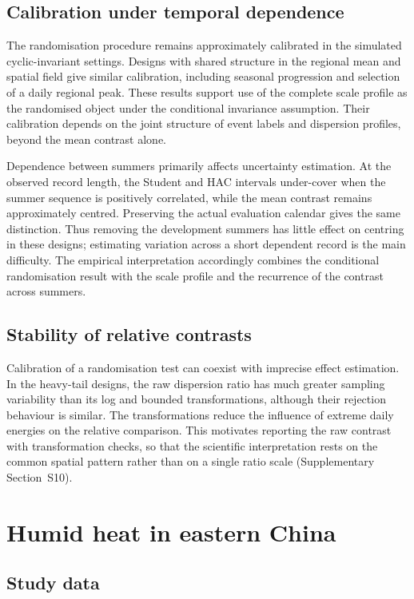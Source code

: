 \documentclass[namedate,webpdf,modern,mediumone]{oup-authoring-template}
\begin{document}
\subsection{Calibration under temporal dependence}

The randomisation procedure remains approximately calibrated in the
simulated cyclic-invariant settings. Designs with shared structure in the
regional mean and spatial field give similar calibration, including seasonal
progression and selection of a daily regional peak. These results support
use of the complete scale profile as the randomised object under the
conditional invariance assumption. Their calibration depends on the joint structure of event labels and
dispersion profiles, beyond the mean contrast alone.

Dependence between summers primarily affects uncertainty estimation. At the
observed record length, the Student and HAC intervals under-cover when the
summer sequence is positively correlated, while the mean contrast remains
approximately centred. Preserving the actual evaluation calendar gives the
same distinction. Thus removing the development summers has little effect on
centring in these designs; estimating variation across a short dependent
record is the main difficulty. The empirical interpretation accordingly
combines the conditional randomisation result with the scale profile and the
recurrence of the contrast across summers.

\subsection{Stability of relative contrasts}

Calibration of a randomisation test can coexist with imprecise effect
estimation. In the heavy-tail designs, the raw dispersion ratio has much
greater sampling variability than its log and bounded transformations,
although their rejection behaviour is similar. The transformations reduce
the influence of extreme daily energies on the relative comparison. This
motivates reporting the raw contrast with transformation checks, so that the
scientific interpretation rests on the common spatial pattern rather than on
a single ratio scale (Supplementary Section~S10).

\section{Humid heat in eastern China}

\subsection{Study data}
\end{document}
